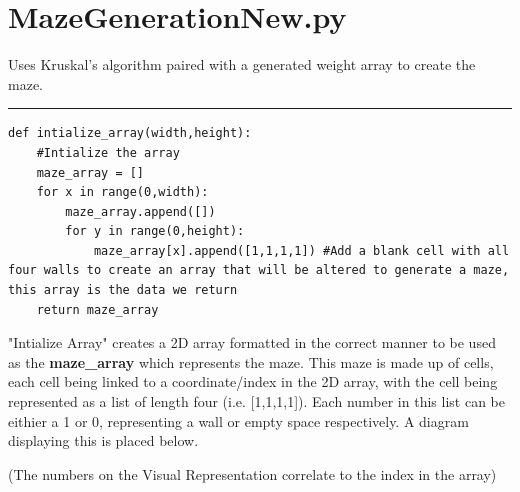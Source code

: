 
\clearpage
\section{MazeGenerationNew.py}
Uses Kruskal’s algorithm paired with a generated weight array to create the maze.

\textcolor[RGB]{220,220,220}{\rule{\linewidth}{0.2pt}}
\begin{lstlisting}
def intialize_array(width,height):
    #Intialize the array
    maze_array = []
    for x in range(0,width):
        maze_array.append([])
        for y in range(0,height):
            maze_array[x].append([1,1,1,1]) #Add a blank cell with all four walls to create an array that will be altered to generate a maze, this array is the data we return
    return maze_array
\end{lstlisting}
"Intialize Array" creates a 2D array formatted in the correct manner to be used as the \textbf{maze\_array} which represents the maze. This maze is made
up of cells, each cell being linked to a coordinate/index in the 2D array, with the cell being represented as a list of length four (i.e. [1,1,1,1]). Each number in
this list can be eithier a 1 or 0, representing a wall or empty space respectively. A diagram displaying this is placed below.
\begin{center}

	\color{mygrey}(The numbers on the Visual Representation correlate to the index in the array)
\end{center}

